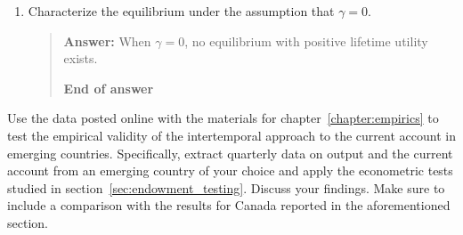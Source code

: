 \begin{exercise}
\begin{enumerate}
\item Characterize the equilibrium under the assumption that $\gamma=0$. 
\begin{quote}
{\bf Answer: } 
 When $\gamma=0$, no equilibrium with positive lifetime utility exists.


{\bf End of answer}
\end{quote}

\end{enumerate}  
\end{exercise}


\begin{exercise}
Use the data posted online with the materials for chapter~\ref{chapter:empirics} to test the empirical validity of the intertemporal approach to the current account in emerging countries. Specifically, extract quarterly data on output and the current account from an emerging country of your choice and apply the econometric tests studied in section~\ref{sec:endowment_testing}. Discuss your findings. Make sure to include a comparison with the results for Canada reported in the aforementioned  section. 
\end{exercise}



